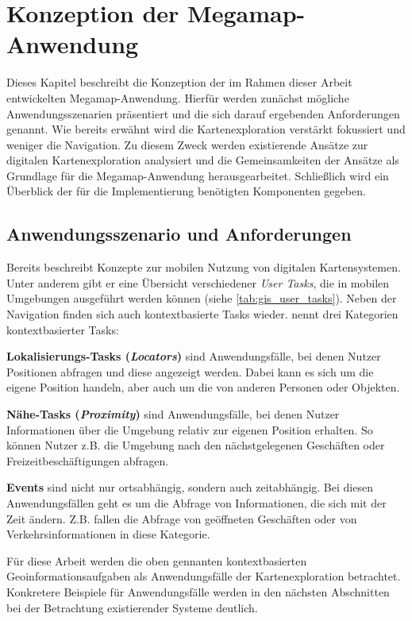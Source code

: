 \chapter{Konzeption der Megamap-Anwendung}
\label{chap:concept}
Dieses Kapitel beschreibt die Konzeption der im Rahmen dieser Arbeit entwickelten Megamap-Anwendung.
Hierfür werden zunächst mögliche Anwendungsszenarien präsentiert und die sich darauf ergebenden Anforderungen genannt.
Wie bereits erwähnt wird die Kartenexploration verstärkt fokussiert und weniger die Navigation.
Zu diesem Zweck werden existierende Ansätze zur digitalen Kartenexploration analysiert und die Gemeinsamkeiten der Ansätze als Grundlage für die Megamap-Anwendung herausgearbeitet.
Schließlich wird ein Überblick der für die Implementierung benötigten Komponenten gegeben.

\section{Anwendungsszenario und Anforderungen}
Bereits \textcite{Reichenbacher2001} beschreibt Konzepte zur mobilen Nutzung von digitalen Kartensystemen.
Unter anderem gibt er eine Übersicht verschiedener \emph{User Tasks}, die in mobilen Umgebungen ausgeführt werden können (siehe \autoref{tab:gis_user_tasks}).
Neben der Navigation finden sich auch kontextbasierte Tasks wieder.
\citeauthor{Reichenbacher2001} nennt drei Kategorien kontextbasierter Tasks:

\textbf{Lokalisierungs-Tasks (\emph{Locators})} sind Anwendungsfälle, bei denen Nutzer Positionen abfragen und diese angezeigt werden.
Dabei kann es sich um die eigene Position handeln, aber auch um die von anderen Personen oder Objekten.

\textbf{Nähe-Tasks (\emph{Proximity})} sind Anwendungsfälle, bei denen Nutzer Informationen über die Umgebung relativ zur eigenen Position erhalten.
So können Nutzer z.B. die Umgebung nach den nächstgelegenen Geschäften oder Freizeitbeschäftigungen abfragen.

\textbf{Events} sind nicht nur ortsabhängig, sondern auch zeitabhängig.
Bei diesen Anwendungsfällen geht es um die Abfrage von Informationen, die sich mit der Zeit ändern.
Z.B. fallen die Abfrage von geöffneten Geschäften oder von Verkehrsinformationen in diese Kategorie.

Für diese Arbeit werden die oben gennanten kontextbasierten Geoinformationsaufgaben als Anwendungsfälle der Kartenexploration betrachtet.
Konkretere Beispiele für Anwendungsfälle werden in den nächsten Abschnitten bei der Betrachtung existierender Systeme deutlich.

